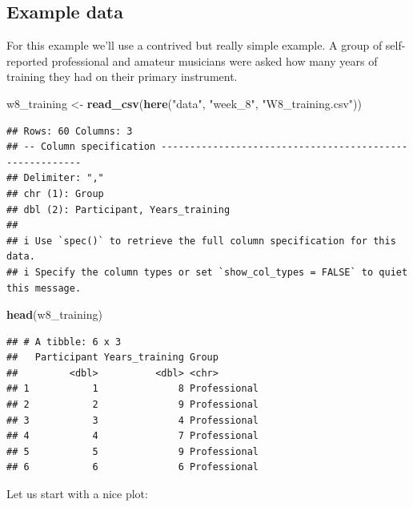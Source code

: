 \documentclass[
]{book}
\newenvironment{Shaded}{\begin{snugshade}}{\end{snugshade}}
\newcommand{\FunctionTok}[1]{\textcolor[rgb]{0.13,0.29,0.53}{\textbf{#1}}}
\newcommand{\NormalTok}[1]{#1}
\newcommand{\OtherTok}[1]{\textcolor[rgb]{0.56,0.35,0.01}{#1}}
\newcommand{\StringTok}[1]{\textcolor[rgb]{0.31,0.60,0.02}{#1}}
\begin{document}
\subsection{Example data}\label{example-data-1}

For this example we'll use a contrived but really simple example. A group of self-reported professional and amateur musicians were asked how many years of training they had on their primary instrument.

\begin{Shaded}
\begin{Highlighting}[]
\NormalTok{w8\_training }\OtherTok{\textless{}{-}} \FunctionTok{read\_csv}\NormalTok{(}\FunctionTok{here}\NormalTok{(}\StringTok{"data"}\NormalTok{, }\StringTok{"week\_8"}\NormalTok{, }\StringTok{"W8\_training.csv"}\NormalTok{))}
\end{Highlighting}
\end{Shaded}

\begin{verbatim}
## Rows: 60 Columns: 3
## -- Column specification --------------------------------------------------------
## Delimiter: ","
## chr (1): Group
## dbl (2): Participant, Years_training
## 
## i Use `spec()` to retrieve the full column specification for this data.
## i Specify the column types or set `show_col_types = FALSE` to quiet this message.
\end{verbatim}

\begin{Shaded}
\begin{Highlighting}[]
\FunctionTok{head}\NormalTok{(w8\_training)}
\end{Highlighting}
\end{Shaded}

\begin{verbatim}
## # A tibble: 6 x 3
##   Participant Years_training Group       
##         <dbl>          <dbl> <chr>       
## 1           1              8 Professional
## 2           2              9 Professional
## 3           3              4 Professional
## 4           4              7 Professional
## 5           5              9 Professional
## 6           6              6 Professional
\end{verbatim}

Let us start with a nice plot:
\end{document}
